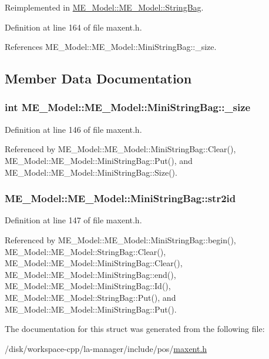 Reimplemented in \hyperlink{structME__Model_1_1StringBag_f1fc09c60ddd0274cc3f4b81377f626f}{ME\_\-Model::ME\_\-Model::StringBag}.

Definition at line 164 of file maxent.h.

References ME\_\-Model::ME\_\-Model::MiniStringBag::\_\-size.

\subsection{Member Data Documentation}
\hypertarget{structME__Model_1_1MiniStringBag_cb5332a124dfcfc8d5b2f5f7881e8d3c}{
\subsubsection[{\_\-size}]{\setlength{\rightskip}{0pt plus 5cm}int ME\_\-Model::ME\_\-Model::MiniStringBag::\_\-size}}
\label{structME__Model_1_1MiniStringBag_cb5332a124dfcfc8d5b2f5f7881e8d3c}




Definition at line 146 of file maxent.h.

Referenced by ME\_\-Model::ME\_\-Model::MiniStringBag::Clear(), ME\_\-Model::ME\_\-Model::MiniStringBag::Put(), and ME\_\-Model::ME\_\-Model::MiniStringBag::Size().\hypertarget{structME__Model_1_1MiniStringBag_b2bc1743c292dfbf4c3953875bb97309}{
\subsubsection[{str2id}]{ ME\_\-Model::ME\_\-Model::MiniStringBag::str2id}}
\label{structME__Model_1_1MiniStringBag_b2bc1743c292dfbf4c3953875bb97309}




Definition at line 147 of file maxent.h.

Referenced by ME\_\-Model::ME\_\-Model::MiniStringBag::begin(), ME\_\-Model::ME\_\-Model::StringBag::Clear(), ME\_\-Model::ME\_\-Model::MiniStringBag::Clear(), ME\_\-Model::ME\_\-Model::MiniStringBag::end(), ME\_\-Model::ME\_\-Model::MiniStringBag::Id(), ME\_\-Model::ME\_\-Model::StringBag::Put(), and ME\_\-Model::ME\_\-Model::MiniStringBag::Put().

The documentation for this struct was generated from the following file:\begin{CompactItemize}
\item 
/disk/workspace-cpp/la-manager/include/pos/\hyperlink{maxent_8h}{maxent.h}\end{CompactItemize}
